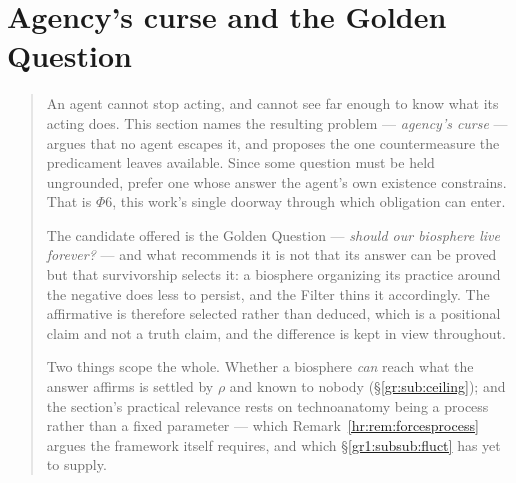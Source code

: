 \documentclass[11pt]{article}
\numberwithin{equation}{section}
\theoremstyle{plain}
\theoremstyle{definition}
\theoremstyle{remark}
\begin{document}
\section{Agency's curse and the Golden Question}\label{ac:sec}

\begin{quote}\small
An agent cannot stop acting, and cannot see far enough to know what its
acting does. This section names the resulting problem --- \emph{agency's
curse} --- argues that no agent escapes it, and proposes the one
countermeasure the predicament leaves available. Since some question
must be held ungrounded, prefer one whose answer the agent's own
existence constrains. That is $\Phi6$, this work's single doorway
through which obligation can enter.

The candidate offered is the Golden Question --- \emph{should our
biosphere live forever?} --- and what recommends it is not that its
answer can be proved but that survivorship selects it: a biosphere
organizing its practice around the negative does less to persist, and
the Filter thins it accordingly. The affirmative is therefore selected
rather than deduced, which is a positional claim and not a truth claim,
and the difference is kept in view throughout.

Two things scope the whole. Whether a biosphere \emph{can} reach what
the answer affirms is settled by $\rho$ and known to nobody
(\S\ref{gr:sub:ceiling}); and the section's practical relevance rests on technoanatomy being a
process rather than a fixed parameter --- which
Remark~\ref{hr:rem:forcesprocess} argues the framework itself requires,
and which \S\ref{gr1:subsub:fluct} has yet to supply.
\end{quote}

\end{document}
